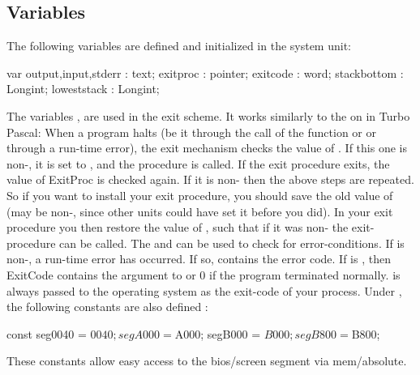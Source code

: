 \documentclass{report}
\begin{document}
\subsection{Variables}
The following variables are defined and initialized in the system unit:
\begin{listing}
var
  output,input,stderr : text;
  exitproc : pointer;
  exitcode : word;
  stackbottom : Longint;
  loweststack : Longint;
\end{listing}
The variables ,  are used in the \fpc exit
scheme. It works similarly to the on in Turbo Pascal:
When a program halts (be it through the call of the  function or
 or through a run-time error), the exit mechanism checks the value
of . If this one is non-, it is set to , and
the procedure is called. If the exit procedure exits, the value of ExitProc
is checked again. If it is non- then the above steps are repeated.
So if you want to install your exit procedure, you should save the old value
of  (may be non-, since other units could have set it before 
you did). In your exit procedure you then restore the value of
, such that if it was non- the exit-procedure can be
called.
The  and  can be used to check for
error-conditions. If  is non-, a run-time error has
occurred. If so,  contains the error code. If  is
, then {ExitCode} contains the argument to  or 0 if the
program terminated normally.
 is always passed to the operating system as the exit-code of
your process.
Under , the following constants are also defined :
\begin{listing}
const
   seg0040 = $0040;
   segA000 = $A000;
   segB000 = $B000;
   segB800 = $B800;
\end{listing}
These constants allow easy access to the bios/screen segment via mem/absolute.
\end{document}
